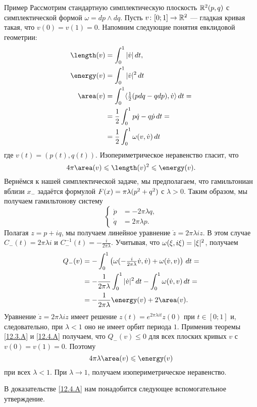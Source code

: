 \begin{ex*}{Пример}
Рассмотрим стандартную симплектическую плоскость $\mathbb{R}^2(p, q)$ с симплектической формой $\omega = dp \wedge dq$.
Пусть $v\colon [0;1] \to\mathbb{R}^2$ --- гладкая кривая такая, что $v(0)=v(1)=0$.
Напомним следующие понятия евклидовой геометрии: 
\begin{align*}
\length(v)&=\int_0^1|\dot v|\,\d t,
\\
\energy(v)&=\int_0^1|\dot v|^2\,\d t
\\
\area(v)&=\int_0^1\langle \tfrac12(p\d q-q\d p),\dot v\rangle\,\d t=
\\
&=\frac12\int_0^1 p\dot q-q\dot p\,\d t=
\\
&=\frac12\int_0^1\omega(v,\dot v)\,\d t
\end{align*}
где $v(t) = (p(t), q(t))$.
Изопериметрическое неравенство гласит, что
\[4\pi\area(v)\le\length(v)^2\le \energy(v).\]
Вернёмся к нашей симплектической задаче, мы предполагаем, что гамильтониан вблизи $x_-$ задаётся формулой $F(x) = \pi \lambda(p^2 \z+ q^2)$ с $\lambda > 0$.
Таким образом, мы получаем гамильтонову систему 
\[
\begin{cases}
\dot p &= -2\pi\lambda q,
\\
\dot q &= 2\pi\lambda p.
\end{cases}
\]
Полагая $z = p + iq$, мы получаем линейное уравнение $\dot z = 2\pi \lambda iz$.
В этом случае $C_-(t) = 2\pi\lambda i$ и $C_-^{-1}(t) = -\frac i{2\pi\lambda}$.
Учитывая, что $\omega(\xi,i\xi) \z= |\xi|^2$, получаем
\begin{align*}
Q_-(v)&=-\int_0^1\left(\omega(-\tfrac i{2\pi\lambda}\dot v,\dot v)+\omega(\dot v, v)\right)\,dt=
\\
&=-\frac 1{2\pi\lambda}\int_0^1|\dot v|^2\,dt-\int_0^1\omega(\dot v,v)\,dt=
\\
&=-\frac 1{2\pi\lambda}\energy(v)+2\area(v).
\end{align*}
Уравнение $\dot z = 2\pi\lambda iz$ имеет решение $z(t) = e^{2\pi\lambda it}z(0)$ при $t \in [0;1]$ и, следовательно, при $\lambda < 1$ оно не имеет орбит периода $1$.
Применив теоремы \ref{12.3.A} и \ref{12.4.A} получаем, что $Q_-(v)\le 0$ для всех плоских кривых $v$ с $v(0) = v(1) = 0$.
Поэтому 
\[4\pi \lambda \area(v) \le \energy (v)\]
при всех $\lambda < 1$.
При $\lambda\to1$, получаем изопериметрическое неравенство.
\end{ex*}

В доказательстве \ref{12.4.A} нам понадобится следующее вспомогательное утверждение.

